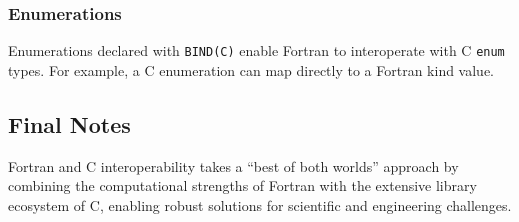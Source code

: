 \subsubsection{Enumerations}
Enumerations declared with \texttt{BIND(C)} enable Fortran to interoperate with C \texttt{enum} types. For example, a C enumeration can map directly to a Fortran kind value.

\subsection{Final Notes}
Fortran and C interoperability takes a ``best of both worlds'' approach by combining the computational strengths of Fortran with the extensive library ecosystem of C, enabling robust solutions for scientific and engineering challenges.

\endinput  %